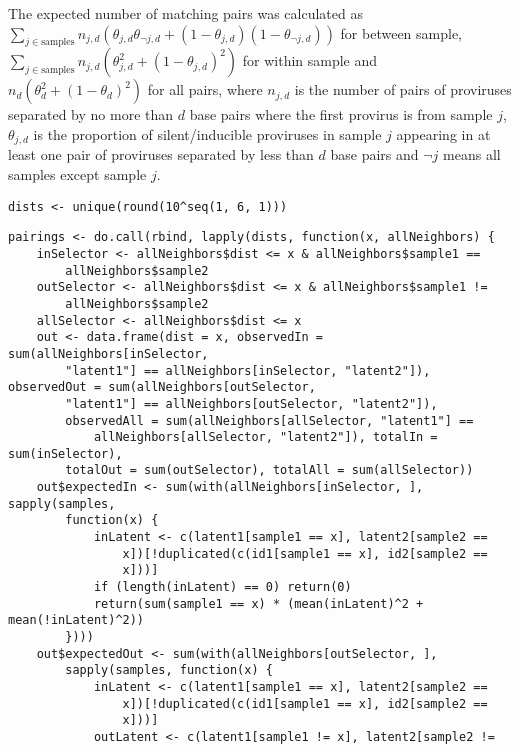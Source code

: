 \documentclass[../../sherrill-Mix_thesis.tex]{subfiles}
\makeatletter
\newenvironment{kframe}{%
 \def\at@end@of@kframe{}%
 \ifinner\ifhmode%
  \def\at@end@of@kframe{\end{minipage}}%
  \begin{minipage}{\columnwidth}%
 \fi\fi%
 \def\FrameCommand##1{\hskip\@totalleftmargin \hskip-\fboxsep
 \colorbox{shadecolor}{##1}\hskip-\fboxsep
     \hskip-\linewidth \hskip-\@totalleftmargin \hskip\columnwidth}%
 \MakeFramed {\advance\hsize-\width
   \@totalleftmargin\z@ \linewidth\hsize
   \@setminipage}}%
 {\par\unskip\endMakeFramed%
 \at@end@of@kframe}
\newenvironment{knitrout}{}{} %
\makeatother
\begin{document}
The expected number of matching pairs was calculated as \(\sum_{j \in \text{samples}} n_{j, d}(\theta_{j, d}\theta_{\neg j, d}+(1-\theta_{j, d})(1-\theta_{\neg j, d}))\) for between sample, \(\sum_{j \in \text{samples}} n_{j, d}(\theta_{j, d}^2+(1-\theta_{j, d})^2)\) for within sample and \(n_{d}(\theta_{d}^2+(1-\theta_{d})^2)\) for all pairs, where $n_{j, d}$ is the number of pairs of proviruses separated by no more than $d$ base pairs where the first provirus is from sample $j$, $\theta_{j, d}$ is the proportion of silent/inducible proviruses in sample $j$ appearing in at least one pair of proviruses separated by less than $d$ base pairs and $\neg j$ means all samples except sample $j$.
\begin{knitrout}
\color{fgcolor}\begin{kframe}
\begin{lstlisting}[basicstyle=\ttfamily,breaklines=true]
dists <- unique(round(10^seq(1, 6, 1)))\end{lstlisting}
\begin{lstlisting}[basicstyle=\ttfamily,breaklines=true]
pairings <- do.call(rbind, lapply(dists, function(x, allNeighbors) {
    inSelector <- allNeighbors$dist <= x & allNeighbors$sample1 == 
        allNeighbors$sample2
    outSelector <- allNeighbors$dist <= x & allNeighbors$sample1 != 
        allNeighbors$sample2
    allSelector <- allNeighbors$dist <= x
    out <- data.frame(dist = x, observedIn = sum(allNeighbors[inSelector, 
        "latent1"] == allNeighbors[inSelector, "latent2"]), observedOut = sum(allNeighbors[outSelector, 
        "latent1"] == allNeighbors[outSelector, "latent2"]), 
        observedAll = sum(allNeighbors[allSelector, "latent1"] == 
            allNeighbors[allSelector, "latent2"]), totalIn = sum(inSelector), 
        totalOut = sum(outSelector), totalAll = sum(allSelector))
    out$expectedIn <- sum(with(allNeighbors[inSelector, ], sapply(samples, 
        function(x) {
            inLatent <- c(latent1[sample1 == x], latent2[sample2 == 
                x])[!duplicated(c(id1[sample1 == x], id2[sample2 == 
                x]))]
            if (length(inLatent) == 0) return(0)
            return(sum(sample1 == x) * (mean(inLatent)^2 + mean(!inLatent)^2))
        })))
    out$expectedOut <- sum(with(allNeighbors[outSelector, ], 
        sapply(samples, function(x) {
            inLatent <- c(latent1[sample1 == x], latent2[sample2 == 
                x])[!duplicated(c(id1[sample1 == x], id2[sample2 == 
                x]))]
            outLatent <- c(latent1[sample1 != x], latent2[sample2 != 

\end{lstlisting}
\end{kframe}
\end{knitrout}
\end{document}
